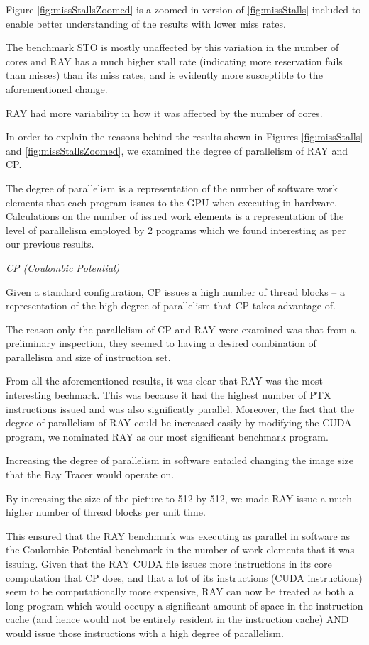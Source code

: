 Figure \ref{fig:missStallsZoomed} is a zoomed in version of
\ref{fig:missStalls} included to enable better understanding of the
results with lower miss rates. 

The benchmark STO is mostly unaffected by this variation in the number of cores and RAY has a much higher
stall rate (indicating more reservation fails than misses) than its
miss rates, and is evidently more susceptible to the aforementioned change. 

RAY had more variability in how it was affected by the number of cores.

In order to explain the reasons behind the results shown in Figures
\ref{fig:missStalls} and \ref{fig:missStallsZoomed}, we examined the
degree of parallelism of RAY and CP.

The degree of parallelism is a representation of the number of software
work elements that each program issues to the GPU when executing in
hardware. 
Calculations on the number of issued work elements is a representation of the level of parallelism employed by
2 programs which we found interesting as per our previous results.

\emph{CP (Coulombic Potential)}

Given a standard configuration, CP issues a high number of thread blocks -- a representation of the high degree of parallelism that CP takes advantage of.

The reason only the parallelism of CP and RAY were examined was that
from a preliminary inspection, they seemed to having a desired
combination of parallelism and size of instruction set. 

From all the aforementioned results, it was clear that RAY was the
most interesting bechmark. 
This was because it had the highest number of PTX instructions issued
and was also significatly parallel. 
Moreover, the fact that the degree of parallelism of RAY could be
increased easily by modifying the CUDA program, we nominated RAY as
our most significant benchmark program.
 
Increasing the degree of parallelism in software entailed changing the
image size that the Ray Tracer would operate on.
 
By increasing the size of the picture to 512 by 512, we made RAY issue a much higher number of thread blocks per unit time. 

This ensured that the RAY benchmark was executing as parallel in
software as the Coulombic Potential benchmark in the number of work
elements that it was issuing. 
Given that the RAY CUDA file issues more instructions in its core
computation that CP does, and that a lot of its instructions (CUDA
instructions) seem to be computationally more expensive, RAY can now
be treated as both a long program which would occupy a significant
amount of space in the instruction cache (and hence would not be
entirely resident in the instruction cache) AND would issue those
instructions with a high degree of parallelism.


